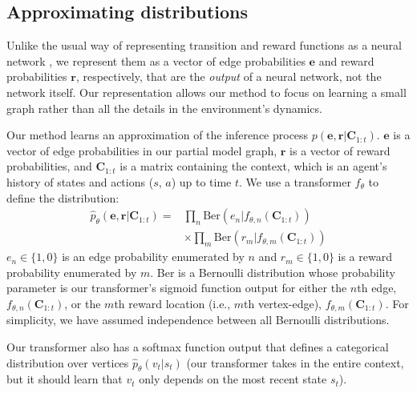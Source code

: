 \documentclass[sigconf]{aamas}
\begin{document}
\subsection{Approximating distributions}
Unlike the usual way of representing transition and reward functions as a neural network \citep[e.g.,][]{haWorldModels2018,schrittwieserMasteringAtariGo2020}, we represent them as a vector of edge probabilities $\mathbf{e}$ and reward probabilities $\mathbf{r}$, respectively, that are the \textit{output} of a neural network, not the network itself. Our representation allows our method to focus on learning a small graph rather than all the details in the environment's dynamics.

Our method learns an approximation of the inference process $p(\mathbf{e}, \mathbf{r}|\mathbf{C}_{1:t})$. $\mathbf{e}$ is a vector of edge probabilities in our partial model graph, $\mathbf{r}$ is a vector of reward probabilities, and $\mathbf{C}_{1:t}$ is a matrix containing the context, which is an agent's history of states and actions ($s$, $a$) up to time $t$. We use a transformer $f_{\theta}$ to define the distribution:
\begin{align*}
  \hat{p}_\theta(\mathbf{e}, \mathbf{r}|\mathbf{C}_{1:t}) = &\prod_n \text{Ber}(e_n|f_{\theta,n}(\mathbf{C}_{1:t})) \\
                                                            &\times \prod_m \text{Ber}(r_m|f_{\theta,m}(\mathbf{C}_{1:t}))
\end{align*}
$e_n \in \{1,0\}$ is an edge probability enumerated by $n$ and $r_m \in \{1,0\}$ is a reward probability enumerated by $m$. Ber is a Bernoulli distribution whose probability parameter is our transformer's sigmoid function output for either the $n$th edge, $f_{\theta,n}(\mathbf{C}_{1:t})$, or the $m$th reward location (i.e., $m$th vertex-edge), $f_{\theta,m}(\mathbf{C}_{1:t})$. For simplicity, we have assumed independence between all Bernoulli distributions.

Our transformer also has a softmax function output that defines a categorical distribution over vertices $\hat{p}_\theta(v_t|s_t)$ (our transformer takes in the entire context, but it should learn that $v_t$ only depends on the most recent state $s_t$).
\end{document}
